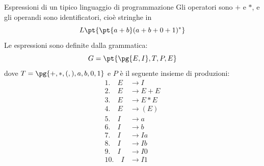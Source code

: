 \begin{example}{Espressioni di un tipico linguaggio di programmazione}{}
    Gli operatori sono $+$ e $*$, e gli operandi sono identificatori, cioè stringhe in
    \[
        L\pt{\pt{a+b}(a+b+0+1)^*}
    \]
    Le espressioni sono definite dalla grammatica:
    \[
        G = \pt{\pg{E,I},T,P,E}
    \]
    dove $T = \pg{+,*,(,),a,b,0,1}$ e $P$ è il seguente insieme di produzioni:
    \[
        \begin{aligned}
            1.\quad E &\to I \\
            2.\quad E &\to E+E\\
            3.\quad E &\to E*E\\
            4.\quad E &\to (E)\\
            5.\quad I &\to a\\
            6.\quad I &\to b\\
            7.\quad I &\to Ia\\
            8.\quad I &\to Ib\\
            9.\quad I &\to I0\\
            10.\quad I &\to I1\\
        \end{aligned}
    \]
\end{example}
%
